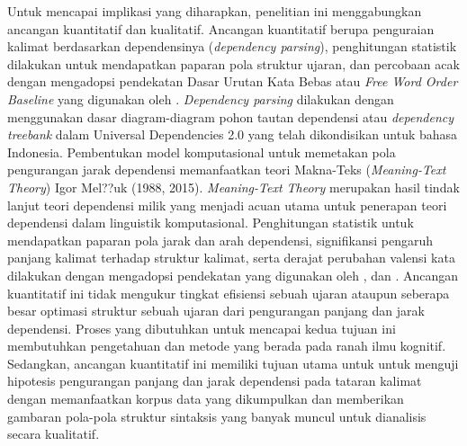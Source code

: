 Untuk mencapai implikasi yang diharapkan, penelitian ini menggabungkan ancangan kuantitatif dan kualitatif. Ancangan kuantitatif berupa penguraian kalimat berdasarkan dependensinya (\textit{dependency parsing}), penghitungan statistik dilakukan untuk mendapatkan paparan pola struktur ujaran, dan percobaan acak dengan mengadopsi pendekatan Dasar Urutan Kata Bebas atau \textit{Free Word Order Baseline} yang digunakan oleh \cite{futrell2015large}. \textit{Dependency parsing} dilakukan dengan menggunakan dasar diagram-diagram pohon tautan dependensi atau \textit{dependency treebank} dalam Universal Dependencies 2.0 \citep{nivre2017universal} yang telah dikondisikan untuk bahasa Indonesia. Pembentukan model komputasional untuk memetakan pola pengurangan jarak dependensi memanfaatkan teori Makna-Teks (\textit{Meaning-Text Theory}) Igor Mel??uk (1988, 2015). \textit{Meaning-Text Theory} merupakan hasil tindak lanjut teori dependensi milik \cite{tesniere1959elements} yang menjadi acuan utama untuk penerapan teori dependensi dalam linguistik komputasional. Penghitungan statistik untuk mendapatkan paparan pola jarak dan arah dependensi, signifikansi pengaruh panjang kalimat terhadap struktur kalimat, serta derajat perubahan valensi kata dilakukan dengan mengadopsi pendekatan yang digunakan oleh \cite{futrell2015large}, \cite{jiang2015effects} dan \cite{liu2017dependency}. Ancangan kuantitatif ini tidak mengukur tingkat efisiensi sebuah ujaran ataupun seberapa besar optimasi struktur sebuah ujaran dari pengurangan panjang dan jarak dependensi. Proses yang dibutuhkan untuk mencapai kedua tujuan ini membutuhkan pengetahuan dan metode yang berada pada ranah ilmu kognitif. Sedangkan, ancangan kuantitatif ini memiliki tujuan utama untuk untuk menguji hipotesis pengurangan panjang dan jarak dependensi pada tataran kalimat dengan memanfaatkan korpus data yang dikumpulkan dan memberikan gambaran pola-pola struktur sintaksis yang banyak muncul untuk dianalisis secara kualitatif.

